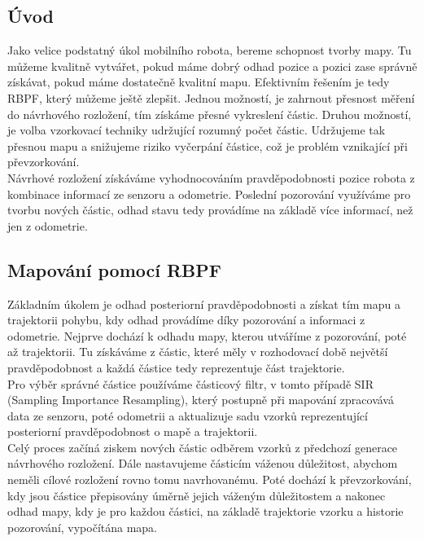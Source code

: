 \documentclass[11pt]{article}
\begin{document}
\subsection{Úvod}
Jako velice podstatný úkol mobilního robota, bereme schopnost tvorby mapy. Tu můžeme kvalitně vytvářet, pokud máme dobrý odhad pozice a pozici zase správně získávat, pokud máme dostatečně kvalitní mapu. Efektivním řešením je tedy RBPF, který můžeme ještě zlepšit. Jednou možností, je zahrnout přesnost měření do návrhového rozložení, tím získáme přesné vykreslení částic. Druhou možností, je volba vzorkovací techniky udržující rozumný počet částic. Udržujeme tak přesnou mapu a snižujeme riziko vyčerpání částice, což je problém vznikající při převzorkování.\\
\indent Návrhové rozložení získáváme vyhodnocováním pravděpodobnosti pozice robota z kombinace informací ze senzoru a odometrie. Poslední pozorování využíváme pro tvorbu nových částic, odhad stavu tedy provádíme na základě více informací, než jen z odometrie. 

\subsection{Mapování pomocí RBPF}
Základním úkolem je odhad posteriorní pravděpodobnosti a získat tím mapu a trajektorii pohybu, kdy odhad provádíme díky pozorování a informaci z odometrie. Nejprve dochází k odhadu mapy, kterou utváříme z pozorování, poté až trajektorii. Tu získáváme z částic, které měly v rozhodovací době největší pravděpodobnost a každá částice tedy reprezentuje část trajektorie.\\
\indent Pro výběr správné částice používáme částicový filtr, v tomto případě SIR (Sampling Importance Resampling), který postupně při mapování zpracovává data ze senzoru, poté odometrii a aktualizuje sadu vzorků reprezentující posteriorní pravděpodobnost o mapě a trajektorii. \\
\indent Celý proces začíná ziskem nových částic odběrem vzorků z předchozí generace návrhového rozložení. Dále nastavujeme částicím váženou důležitost, abychom neměli cílové rozložení rovno tomu navrhovanému. Poté dochází k převzorkování, kdy jsou částice přepisovány úměrně jejich váženým důležitostem a nakonec odhad mapy, kdy je pro každou částici, na základě trajektorie vzorku a historie pozorování, vypočítána mapa.
\end{document}
